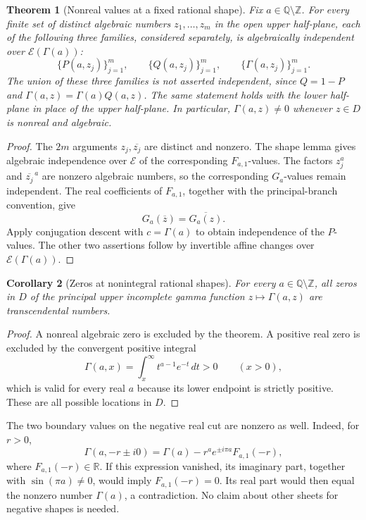 \documentclass[11pt,a4paper]{article}
\newcommand{\E}{\mathcal E}
\newtheorem{theorem}{Theorem}[section]
\newtheorem{corollary}[theorem]{Corollary}
\theoremstyle{definition}
\theoremstyle{remark}
\numberwithin{equation}{section}
\begin{document}
\begin{theorem}[Nonreal values at a fixed rational shape]\label{norm:thm:nonreal-gamma}
Fix \(a\in\mathbb Q\setminus\mathbb Z\). For every finite set of distinct
algebraic numbers \(z_1,\ldots,z_m\) in the open upper half-plane, each
of the following three families, considered separately, is algebraically
independent over \(\E(\Gamma(a))\):
\[
 \{P(a,z_j)\}_{j=1}^m,\qquad
 \{Q(a,z_j)\}_{j=1}^m,\qquad
 \{\Gamma(a,z_j)\}_{j=1}^m.
\]
The union of these three families is not asserted independent, since $Q=1-P$ and $\Gamma(a,z)=\Gamma(a)Q(a,z)$. The same statement holds with the lower half-plane in place of the upper
half-plane. In particular, \(\Gamma(a,z)\ne0\) whenever \(z\in D\) is
nonreal and algebraic.
\end{theorem}
\begin{proof}
The \(2m\) arguments \(z_j,\overline{z_j}\) are distinct and nonzero.
The shape lemma gives algebraic independence over
\(\E\) of the corresponding \(F_{a,1}\)-values.  The factors
\(z_j^a\) and \(\overline{z_j}^{\,a}\) are nonzero algebraic numbers,
so the corresponding \(G_a\)-values remain independent. The real
coefficients of \(F_{a,1}\), together with the principal-branch convention,
give
\[
 G_a(\overline z)=\overline{G_a(z)}.
\]
Apply conjugation descent with \(c=\Gamma(a)\) to obtain independence of
the \(P\)-values. The other two assertions follow by invertible affine
changes over \(\E(\Gamma(a))\).
\end{proof}

\begin{corollary}[Zeros at nonintegral rational shapes]\label{norm:cor:upper-gamma-zeros}
For every \(a\in\mathbb Q\setminus\mathbb Z\), all zeros in \(D\) of
the principal upper incomplete gamma function \(z\mapsto\Gamma(a,z)\)
are transcendental numbers.
\end{corollary}
\begin{proof}
A nonreal algebraic zero is excluded by the theorem. A positive real
zero is excluded by the convergent positive integral
\[
 \Gamma(a,x)=\int_x^{\infty}t^{a-1}e^{-t}\,dt>0
 \qquad(x>0),
\]
which is valid for every real \(a\) because its lower endpoint is
strictly positive. These are all possible locations in \(D\).
\end{proof}

The two boundary values on the negative real cut are nonzero as well.
Indeed, for \(r>0\),
\[
 \Gamma(a,-r\pm i0)
 =\Gamma(a)-r^a e^{\pm i\pi a}F_{a,1}(-r),
\]
where \(F_{a,1}(-r)\in\mathbb R\). If this expression vanished, its imaginary
part, together with \(\sin(\pi a)\ne0\), would imply \(F_{a,1}(-r)=0\).
Its real part would then equal the nonzero number \(\Gamma(a)\), a
contradiction. No claim about other sheets for negative shapes is needed.
\end{document}

